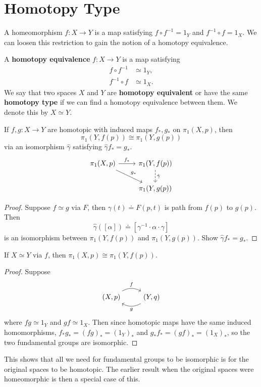 \documentclass[twoside,10pt]{report}
\begin{document}

\section{Homotopy Type}

A homeomorphism $f:X\to Y$ is a map satisfying $f \circ f^{-1}=1_{Y}$ and $f^{-1} \circ f=1_{X}$. We can loosen this restriction to gain the notion of a homotopy equivalence.

\begin{defn}[]
	A \textbf{homotopy equivalence} $f:X\to Y$ is a map satisfying
\begin{align*}
	f \circ f^{-1} &\simeq 1_{Y},\\
	f^{-1} \circ f &\simeq 1_{X}.
\end{align*}
We say that two spaces $X$ and $Y$ are \textbf{homotopy equivalent} or have the same \textbf{homotopy type} if we can find a homotopy equivalence between them. We denote this by $X \simeq Y$.
\end{defn}

\begin{prop}
	If $f,g:X\to Y$ are homotopic with induced maps $f_{*},g_{*}$ on $\pi_1(X,p)$, then
	\[
		\pi_1(Y,f(p)) \cong \pi_1(Y,g(p))
	\] via an isomorphism $\hat{\gamma}$ satisfying $\hat{\gamma}f_{*}=g_{*}$.
\[
\begin{tikzcd}
	\pi_1(X,p)\rar{f_{*}}\arrow[dr,"g_{*}"]&\pi_1(Y,f(p))\dar[dashed]{\hat{\gamma}}\\
			     &\pi_1(Y,g(p))
\end{tikzcd}
\] 
\end{prop}
\begin{proof}
	Suppose $f \simeq g$ via $F$, then $\gamma(t) \doteq F(p,t)$ is path from $f(p)$ to $g(p)$. Then
	\[
		\hat{\gamma}([\alpha]) \doteq [\gamma^{-1} \cdot \alpha \cdot \gamma]
	\] is an isomorphism between $\pi_1(Y,f(p))$ and $\pi_1(Y,g(p))$. {\color{red}Show $\hat{\gamma}f_{*}=g_{*}$.}
\end{proof}

\begin{prop}
	If $X \simeq Y$ via $f$, then $\pi_1(X,p)\cong \pi_1(Y,f(p))$.
\end{prop}
\begin{proof}
	Suppose
	\[
        \begin{tikzcd}
                (X,p)\arrow[r,"f",bend left]&(Y,q)\arrow[l,"g",bend left]
        \end{tikzcd}
        \]
	where $fg \simeq 1_{Y}$ and $gf \simeq 1_{X}$. Then since homotopic maps have the same induced homomorphisms, $f_{*}g_{*}=(fg)_{*}=(1_{Y})_{*}$ and $g_{*}f_{*}=(gf)_{*}=(1_{X})_{*}$, so the two fundamental groups are isomorphic.
\end{proof}
This shows that all we need for fundamental groups to be isomorphic is for the original spaces to be homotopic. The earlier result when the original spaces were homeomorphic is then a special case of this.
\end{document}
